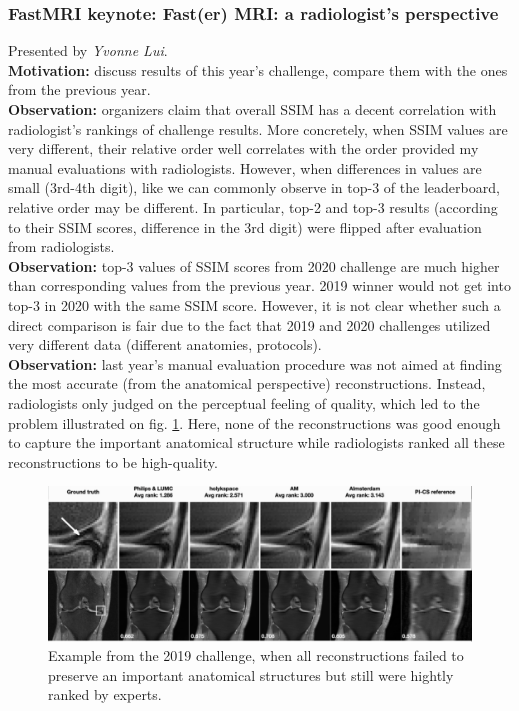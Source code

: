 \subsubsection{FastMRI keynote: Fast(er) MRI: a radiologist's perspective}

Presented by \textit{Yvonne Lui}. \\

{\bf Motivation:} discuss results of this year's challenge, compare them with the ones from the previous year. \\

{\bf Observation:} organizers claim that overall SSIM has a decent correlation with radiologist's rankings of challenge results. 
More concretely, when SSIM values are very different, their relative order well correlates with the order provided my manual evaluations with radiologists.
However, when differences in values are small (3rd-4th digit), like we can commonly observe in top-3 of the leaderboard, relative order may be different. 
In particular, top-2 and top-3 results (according to their SSIM scores, difference in the 3rd digit) were flipped after evaluation from radiologists. \\

{\bf Observation:} top-3 values of SSIM scores from 2020 challenge are much higher than corresponding values from the previous year.
2019 winner would not get into top-3 in 2020 with the same SSIM score. 
However, it is not clear whether such a direct comparison is fair due to the fact that 2019 and 2020 challenges utilized very different data (different anatomies, protocols). \\

{\bf Observation:} last year's manual evaluation procedure was not aimed at finding the most accurate (from the anatomical perspective) reconstructions.
Instead, radiologists only judged on the perceptual feeling of quality, which led to the problem illustrated on fig. \ref{fig:2019_problems}. 
Here, none of the reconstructions was good enough to capture the important anatomical structure while radiologists ranked all these reconstructions to be high-quality. \\

\begin{figure}[h!]
    \centering
    \includegraphics[scale=0.4]{neurips-2020/images/Screenshot 2020-12-15 at 11.17.48.png}
    \caption{Example from the 2019 challenge, when all reconstructions failed to preserve an important anatomical structures but still were hightly ranked by experts.}
    \label{fig:2019_problems}
\end{figure}

